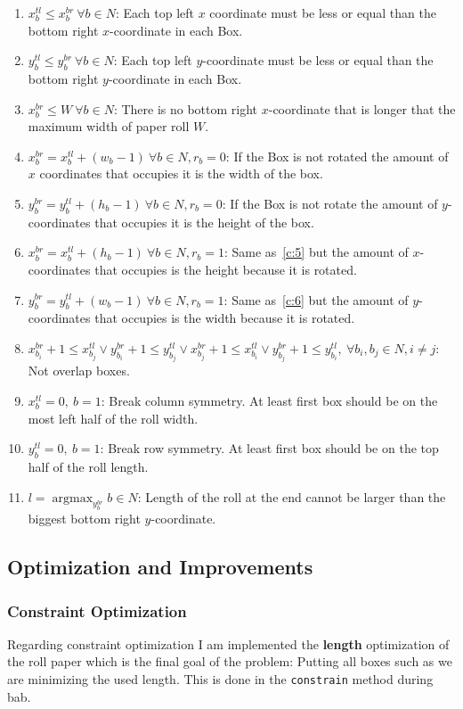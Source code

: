 \documentclass[12pt, a4paper]{article}
\DeclareMathOperator*{\argmax}{argmax} %
\begin{document}
\begin{enumerate}
  \item $x_b^{tl} \leq x_b^{br}\ \forall b \in N$: Each top left $x$ coordinate must be less or equal than the bottom right $x$-coordinate in each Box.
  \item $y_b^{tl} \leq y_b^{br}\ \forall b \in N$: Each top left $y$-coordinate must be less or equal than the bottom right $y$-coordinate in each Box.
  \item\label{c:4} $x_b^{br} \leq W\ \forall b \in N$: There is no bottom right $x$-coordinate that is longer that the maximum width of paper roll $W$.
\item\label{c:5} $x_b^{br} = x_b^{tl} + (w_b - 1)\ \forall b \in N, r_b = 0$: If the Box is not rotated the amount of $x$ coordinates that occupies it is the width of the box.
\item\label{c:6} $y_b^{br} = y_b^{tl} + (h_b - 1)\ \forall b \in N, r_b = 0$: If the Box is not rotate the amount of $y$-coordinates that occupies it is the height of the box.
\item $x_b^{br} = x_b^{tl} + (h_b - 1)\ \forall b \in N, r_b = 1$: Same as~\ref{c:5} but the amount of $x$-coordinates that occupies is the height because it is rotated.
  \item $y_b^{br} = y_b^{tl} + (w_b - 1)\ \forall b \in N, r_b = 1$: Same as~\ref{c:6} but the amount of $y$-coordinates that occupies is the width because it is rotated.
  \item\label{c:7} $x_{b_i}^{br} + 1 \leq x_{b_j}^{tl} \lor y_{b_i}^{br} + 1 \leq y_{b_j}^{tl} \lor x_{b_j}^{br} + 1 \leq x_{b_i}^{tl} \lor y_{b_j}^{br} + 1 \leq y_{b_i}^{tl}, \ \forall b_i, b_j \in N, i \neq j$: Not overlap boxes.
  \item $x_b^{tl} = 0,\ b = 1$: Break column symmetry. At least first box should be on the most left half of the roll width.
   \item $y_b^{tl} = 0,\ b = 1$: Break row symmetry. At least first box should be on the top half of the roll length.
  \item $l = \argmax_{y_b^{br}} {b \in N}$: Length of the roll at the end cannot be larger than the biggest bottom right $y$-coordinate.
\end{enumerate}

\subsection{Optimization and Improvements}
\subsubsection{Constraint Optimization}
Regarding constraint optimization I am implemented the \textbf{length} optimization of the roll paper which is the final goal of the problem: Putting all boxes such as we are minimizing the used length. This is done in the \texttt{constrain} method during \acrfull{bab}.
\end{document}
